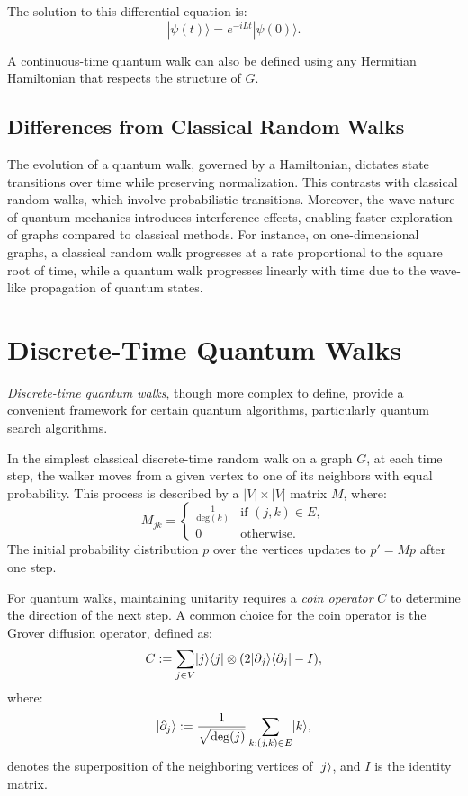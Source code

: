 \documentclass[11pt]{article}
\theoremstyle{definition}
\begin{document}
The solution to this differential equation is:
\[
|\psi(t)\rangle = e^{-iLt} |\psi(0)\rangle.
\]

A continuous-time quantum walk can also be defined using any Hermitian Hamiltonian that respects the structure of \( G \).

\subsection*{Differences from Classical Random Walks}
The evolution of a quantum walk, governed by a Hamiltonian, dictates state transitions over time while preserving normalization. This contrasts with classical random walks, which involve probabilistic transitions. Moreover, the wave nature of quantum mechanics introduces interference effects, enabling faster exploration of graphs compared to classical methods. For instance, on one-dimensional graphs, a classical random walk progresses at a rate proportional to the square root of time, while a quantum walk progresses linearly with time due to the wave-like propagation of quantum states.

\section*{Discrete-Time Quantum Walks}
\textit{Discrete-time quantum walks}, though more complex to define, provide a convenient framework for certain quantum algorithms, particularly quantum search algorithms.

In the simplest classical discrete-time random walk on a graph \( G \), at each time step, the walker moves from a given vertex to one of its neighbors with equal probability. This process is described by a \( |V| \times |V| \) matrix \( M \), where:
\[
M_{jk} = 
\begin{cases} 
\frac{1}{\text{deg}(k)} & \text{if } (j, k) \in E, \\
0 & \text{otherwise}.
\end{cases}
\]
The initial probability distribution \( p \) over the vertices updates to \( p' = M p \) after one step.

For quantum walks, maintaining unitarity requires a \textit{coin operator} \( C \) to determine the direction of the next step. A common choice for the coin operator is the Grover diffusion operator, defined as:
\[
C := \sum_{j \in V}\lvert j\rangle\langle j\rvert \otimes (2\lvert\partial_j\rangle\langle\partial_j\rvert - I),
\]
where:
\[
\lvert\partial_j\rangle := \frac{1}{\sqrt{\deg(j)}} \sum_{k:(j,k) \in E}\lvert k\rangle,
\]
denotes the superposition of the neighboring vertices of \( \lvert j\rangle \), and \( I \) is the identity matrix.
\end{document}
